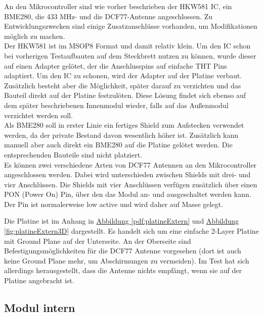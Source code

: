 \documentclass[a4paper,11pt]{article}
\newcounter{subsubsubsection}[subsubsection]
\begin{document}
\vspace{0.2cm}
\noindent
An den Mikrocontroller sind wie vorher beschrieben der HKW581 IC, ein BME280, die 433 MHz- und die DCF77-Antenne angeschlossen. Zu Entwicklungszwecken sind einige 
Zusatzanschlüsse vorhanden, um Modifikationen möglich zu machen. \\
Der HKW581 ist im MSOP8 Format und damit relativ klein. Um den IC schon bei vorherigen Testaufbauten auf dem Steckbrett nutzen zu können, wurde dieser auf einen Adapter
gelötet, der die Anschlusspins auf einfache THT Pins adaptiert. Um den IC zu schonen, wird der Adapter auf der Platine verbaut. Zusätzlich besteht aber die Möglichkeit, 
später darauf zu verzichten und das Bauteil direkt auf der Platine festzulöten. Diese Lösung findet sich ebenso auf dem später beschriebenen Innenmodul wieder, falls
auf das Außenmodul verzichtet werden soll. \\
Als BME280 soll in erster Linie ein fertiges Shield zum Aufstecken verwendet werden, da der private Bestand davon wesentlich höher ist. Zusätzlich kann manuell aber auch
direkt ein BME280 auf die Platine gelötet werden. Die entsprechenden Bauteile sind nicht platziert. \\
Es können zwei verschiedene Arten von DCF77 Antennen an den Mikrocontroller angeschlossen werden. Dabei wird unterschieden zwischen Shields mit drei- und vier Anschlüssen. 
Die Shields mit vier Anschlüssen verfügen zusätzlich über einen PON (Power On) Pin, über den das Modul an- und ausgeschaltet werden kann. Der Pin ist normalerweise low
active und wird daher auf Masse gelegt. 

\label{subsubsubsub:platineExtern}

Die Platine ist im Anhang in \hyperref[pdf:platineExtern]{Abbildung \ref{pdf:platineExtern}} und \hyperref[fig:platineExtern3D]{Abbildung \ref{fig:platineExtern3D}} dargestellt. Es handelt sich um eine einfache 2-Layer Platine mit Ground Plane
auf der Unterseite. An der Oberseite sind Befestigungsmöglichkeiten für die DCF77 Antenne vorgesehen (dort ist auch keine Ground Plane mehr, um Abschirmungen zu vermeiden). 
Im Test hat sich allerdings herausgestellt, dass die Antenne nichts empfängt, wenn sie auf der Platine angebracht ist. 

\newpage
\subsection{Modul intern}
\label{subsub:modulInt}
\end{document}
